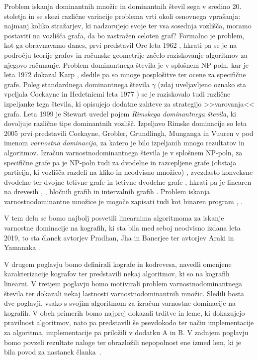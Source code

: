 \documentclass[12pt,a4paper,twoside]{article}
\theoremstyle{definition} %
\theoremstyle{plain} %
\numberwithin{equation}{section}  %
\begin{document}
Problem iskanja dominantnih množic in dominantnih števil sega v sredino 20. stoletja in se skozi različne variacije problema vrti okoli osnovnega vprašanja: najmanj koliko stražarjev, ki nadzorujejo svoje ter vsa sosednja vozlišča, moramo postaviti na vozlišča grafa, da bo zastražen celoten graf? Formalno je problem, kot ga obravnavamo danes, prvi predstavil Ore leta 1962 \cite{ore1962theory}, hkrati pa se je na področju teorije grafov in računske geometrije začelo raziskovanje algoritmov za njegovo računanje. Problem dominantnega števila je v splošnem NP-poln, kar je leta 1972 dokazal Karp \cite{karp1972reducibility}, sledile pa so mnoge posplošitve ter ocene za specifične grafe.  Poleg standardnega dominantnega števila $\gamma$ (zdaj uveljavljeno oznako sta vpeljala Cockayne in Hedetniemi leta 1977 \cite{cockayne1977towards})  se je raziskovalo tudi različne izpeljanke tega števila, ki opisujejo dodatne zahteve za strategijo >>varovanja<< grafa. Leta 1999 je Stewart \cite{stewart1999defend} uvedel pojem \emph{Rimskega dominantnega števila}, ki dovoljuje različne tipe dominantnih vozlišč. Izpeljavo Rimske dominacije so leta 2005 prvi predstavili Cockayne, Grobler, Grundlingh, Munganga in Vuuren v \cite{cockayne2005protection} pod imenom \emph{varnostna dominacija}, za katero je bilo izpeljanih mnogo rezultatov in algoritmov. Izračun varnostnodominantnega števila je v splošnem NP-poln, za specifične grafe pa je NP-poln tudi za dvodelne in razcepljene grafe (obstaja particija, ki vozlišča razdeli na kliko in neodvisno množico) \cite{merouane2015secure}, zvezdasto konveksne dvodelne ter dvojne tetivne grafe \cite{wang2018complexity} in tetivne dvodelne grafe \cite{pradhan2018computing}, hkrati pa je linearen na drevesih  \cite{burger2014linear}, \cite{li2017secure}, bločnih grafih \cite{pradhan2018computing} in intervalnih grafih \cite{araki2018secure}. Problem iskanja varnostnodominantne množice je mogoče zapisati tudi kot binaren program \cite{burdett2020improved}, \cite{burger2013binary}.

V tem delu se bomo najbolj posvetili linearnima algoritmoma za iskanje varnostne dominacije na kografih, ki sta bila med seboj neodvisno izdana leta 2019, to sta članek avtorjev Pradhan, Jha in Banerjee \cite{jha2019secure} ter avtorjev Araki in Yamanaka \cite{araki2019secure}.

\medskip
V drugem poglavju bomo definirali kografe in kodrevesa, navedli omenjene karakterizacije kografov ter predstavili nekaj algoritmov, ki so na kografih linearni. V tretjem poglavju bomo motivirali problem varnostnodominantnega števila ter dokazali nekaj lastnosti varnostnodominantnih množic. Sledili bosta dve poglavji, vsako s svojim algoritmom za izračun varnostne dominacije na kografih. V obeh primerih bomo najprej dokazali trditve in leme, ki dokazujejo pravilnost algoritmov, nato pa predstavili še psevdokodo ter način implementacije za algoritma, implementacije pa priložili v dodatku A in B. V zadnjem poglavju bomo povzeli rezultate naloge ter obrazložili nepopolnost ene izmed lem, ki je bila povod za nastanek članka~\cite{kisek2020onJha}.
\end{document}
